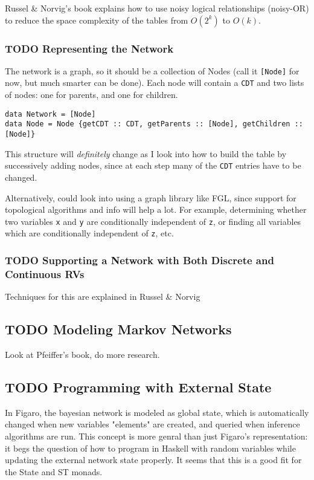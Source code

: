 \documentclass[11pt]{article}
\begin{document}
Russel \& Norvig's book explains how to use noisy logical
relationships (noisy-OR) to reduce the space complexity of the tables
from $O(2^k)$ to $O(k)$. 

\subsubsection{{\bfseries\sffamily TODO} Representing the Network}
\label{sec-2-2-2}
The network is a graph, so it should be a collection of Nodes
(call it \texttt{[Node]} for now, but much smarter can be done). Each
node will contain a \texttt{CDT} and two lists of nodes: one for
parents, and one for children.
\begin{center}
\texttt{data Network = [Node]} \\
      \texttt{data Node = Node \{getCDT :: CDT, getParents :: [Node], getChildren :: [Node]\}}
\end{center}

This structure will \emph{definitely} change as I look into how to
build the table by successively adding nodes, since at each step
many of the \texttt{CDT} entries have to be changed. 

Alternatively, could look into using a graph library like FGL,
since support for topological algorithms and info will help a
lot. For example, determining whether two variables \texttt{x} and \texttt{y}
are conditionally independent of \texttt{z}, or finding all variables
which are conditionally independent of \texttt{z}, etc.

\subsubsection{{\bfseries\sffamily TODO} Supporting a Network with Both Discrete and Continuous RVs}
\label{sec-2-2-3}
Techniques for this are explained in Russel \& Norvig

\subsection{{\bfseries\sffamily TODO} Modeling Markov Networks}
\label{sec-2-3}
Look at Pfeiffer's book, do more research.

\subsection{{\bfseries\sffamily TODO} Programming with External State}
\label{sec-2-4}
In Figaro, the bayesian network is modeled as global state, which 
is automatically changed when new variables "elements" are created,
and queried when inference algorithms are run. This concept is more
genral than just Figaro's representation: it begs the question of
how to program in Haskell with random variables while updating
the external network state properly. It seems that this is a good
fit for the State and ST monads.
\end{document}
